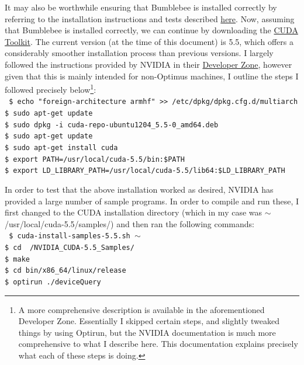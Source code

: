 \documentclass[a4paper,10pt]{article}
\begin{document}
It may also be worthwhile ensuring that Bumblebee is installed correctly by 
referring to the installation instructions and tests described
\href{https://wiki.ubuntu.com/Bumblebee#Installation}{here}.  Now, assuming 
that Bumblebee is installed correctly, we can continue by downloading the 
\href{https://developer.nvidia.com/cuda-downloads?sid=412586}{CUDA Toolkit}.
The current version (at the time of this document) is 5.5, which offers a
considerably smoother installation process than previous versions.  I largely
followed the instructions provided by NVIDIA in their
\href{http://docs.nvidia.com/cuda/cuda-getting-started-guide-for-linux/}{
Developer Zone}, however given that this is mainly intended for non-Optimus
machines, I outline the steps I followed precisely below\footnote{A more
comprehensive description is available in the aforementioned Developer Zone.
Essentially I skipped certain steps, and slightly tweaked things by using 
Optirun, but the NVIDIA documentation is much more comprehensive to what I
describe here.  This documentation explains precisely what each of these steps
is doing.}: \\

\vspace{-5mm}
\texttt{
\hspace{-7mm}\$ echo "foreign-architecture armhf" >> /etc/dpkg/dpkg.cfg.d/multiarch \\
\$ sudo apt-get update \\
\$ sudo dpkg -i cuda-repo-ubuntu1204\_5.5-0\_amd64.deb \\
\$ sudo apt-get update \\
\$ sudo apt-get install cuda \\
\$ export PATH=/usr/local/cuda-5.5/bin:\$PATH \\
\$ export LD\_LIBRARY\_PATH=/usr/local/cuda-5.5/lib64:\$LD\_LIBRARY\_PATH \\
}

In order to test that the above installation worked as desired, NVIDIA has 
provided a large number of sample programs.  In order to compile and run these,
I first changed to the CUDA installation directory (which in my case was
$\sim$/usr/local/cuda-5.5/samples/) and then ran the following commands: \\

\vspace{-5mm}
\texttt{
\hspace{-7mm}\$ cuda-install-samples-5.5.sh  $\sim$ \\
\$ cd ~/NVIDIA\_CUDA-5.5\_Samples/ \\
\$ make \\
\$ cd bin/x86\_64/linux/release \\
\$ optirun ./deviceQuery \\
}
\end{document}
